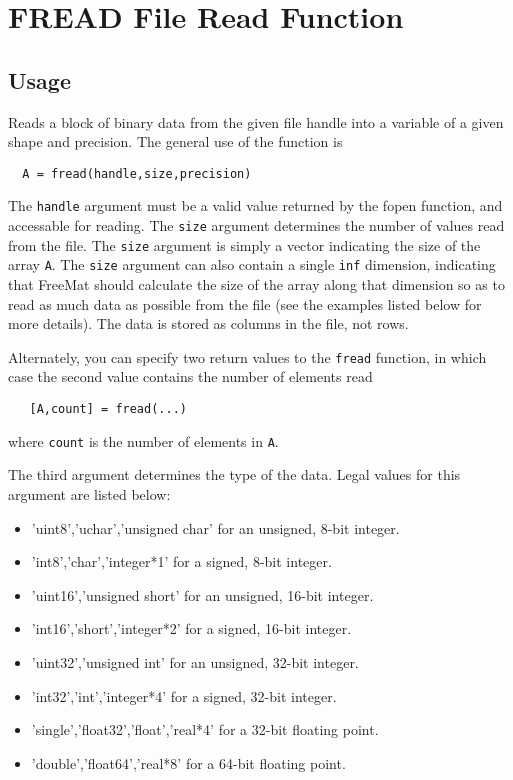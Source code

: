 \section{FREAD File Read Function}

\subsection{Usage}

Reads a block of binary data from the given file handle into a variable
of a given shape and precision.  The general use of the function is
\begin{verbatim}
  A = fread(handle,size,precision)
\end{verbatim}
The \verb|handle| argument must be a valid value returned by the fopen 
function, and accessable for reading.  The \verb|size| argument determines
the number of values read from the file.  The \verb|size| argument is simply
a vector indicating the size of the array \verb|A|.  The \verb|size| argument
can also contain a single \verb|inf| dimension, indicating that FreeMat should
calculate the size of the array along that dimension so as to read as
much data as possible from the file (see the examples listed below for
more details).  The data is stored as columns in the file, not 
rows.
    
Alternately, you can specify two return values to the \verb|fread| function,
in which case the second value contains the number of elements read
\begin{verbatim}
   [A,count] = fread(...)
\end{verbatim}
where \verb|count| is the number of elements in \verb|A|.

The third argument determines the type of the data.  Legal values for this
argument are listed below:
\begin{itemize}
\item  'uint8','uchar','unsigned char' for an unsigned, 8-bit integer.

\item  'int8','char','integer*1' for a signed, 8-bit integer.

\item  'uint16','unsigned short' for an unsigned, 16-bit  integer.

\item  'int16','short','integer*2' for a signed, 16-bit integer.

\item  'uint32','unsigned int' for an unsigned, 32-bit integer.

\item  'int32','int','integer*4' for a signed, 32-bit integer.

\item  'single','float32','float','real*4' for a 32-bit floating point.

\item  'double','float64','real*8' for a 64-bit floating point.

\end{itemize}

